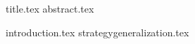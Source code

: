 \documentclass[11pt]{llncs}
\begin{document}
  {title.tex}
  \thispagestyle{plain}
  {abstract.tex}

  {introduction.tex}
  {strategygeneralization.tex}
  
\end{document}
